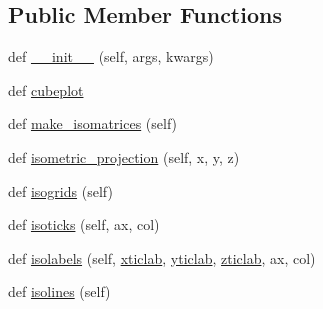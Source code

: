 \subsection*{Public Member Functions}
\begin{DoxyCompactItemize}
\item 
def \hyperlink{class_uni_dec_1_1unidec__modules_1_1plot3d_1_1_cube_plot_a9a743875cd247c57f865fde245b2ca09}{\+\_\+\+\_\+init\+\_\+\+\_\+} (self, args, kwargs)
\item 
def \hyperlink{class_uni_dec_1_1unidec__modules_1_1plot3d_1_1_cube_plot_a8c02b303139191d97f0ee5235d792e4d}{cubeplot}
\item 
def \hyperlink{class_uni_dec_1_1unidec__modules_1_1plot3d_1_1_cube_plot_aec9b08b9344b90b2c6dabb17d12b6a56}{make\+\_\+isomatrices} (self)
\item 
def \hyperlink{class_uni_dec_1_1unidec__modules_1_1plot3d_1_1_cube_plot_a752c5cc5cde2c3c2f940f226b2524735}{isometric\+\_\+projection} (self, x, y, z)
\item 
def \hyperlink{class_uni_dec_1_1unidec__modules_1_1plot3d_1_1_cube_plot_ad28ab5f561275c28ca64dc8bae18690b}{isogrids} (self)
\item 
def \hyperlink{class_uni_dec_1_1unidec__modules_1_1plot3d_1_1_cube_plot_a60d357a3567507f93027ca437149a042}{isoticks} (self, ax, col)
\item 
def \hyperlink{class_uni_dec_1_1unidec__modules_1_1plot3d_1_1_cube_plot_aae1f98baa6e71e13956bf4ed9c16e312}{isolabels} (self, \hyperlink{class_uni_dec_1_1unidec__modules_1_1plot3d_1_1_cube_plot_a15067fc56f09cdd9cec416b535fc0543}{xticlab}, \hyperlink{class_uni_dec_1_1unidec__modules_1_1plot3d_1_1_cube_plot_a6485ef8a24d0d9757b1542bd62beefbb}{yticlab}, \hyperlink{class_uni_dec_1_1unidec__modules_1_1plot3d_1_1_cube_plot_a6e40b70f52af024b9a43a8e65da546b7}{zticlab}, ax, col)
\item 
def \hyperlink{class_uni_dec_1_1unidec__modules_1_1plot3d_1_1_cube_plot_a8665eda43d413cad20e726ed4ba4108f}{isolines} (self)
\end{DoxyCompactItemize}
